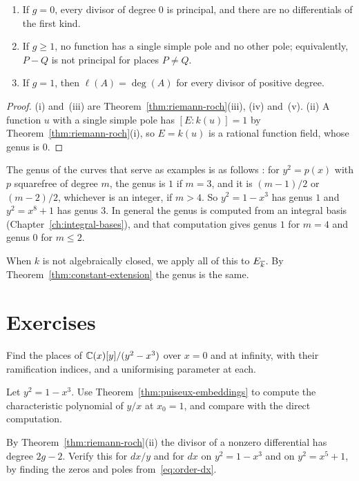 \begin{corollary}\label{cor:rr-consequences}
\begin{enumerate}[label=\textup{(\roman*)}]
\item If $g = 0$, every divisor of degree $0$ is principal, and there are no
  differentials of the first kind.
\item If $g \ge 1$, no function has a single simple pole and no other pole;
  equivalently, $P - Q$ is not principal for places $P \ne Q$.
\item If $g = 1$, then $\ell(A) = \deg(A)$ for every divisor of positive
  degree.
\end{enumerate}
\end{corollary}

\begin{proof}
(i) and~(iii) are Theorem~\ref{thm:riemann-roch}(iii), (iv) and~(v). (ii) A
function $u$ with a single simple pole has $[E : k(u)] = 1$ by
Theorem~\ref{thm:riemann-roch}(i), so $E = k(u)$ is a rational function
field, whose genus is $0$.
\end{proof}

The genus of the curves that serve as examples is as follows
\cite[Propositions~6.1.3 and~6.2.3]{stichtenoth2009}: for $y^2 = p(x)$ with
$p$ squarefree of degree $m$, the genus is $1$ if $m = 3$, and it is
$(m - 1)/2$ or $(m - 2)/2$, whichever is an integer, if $m > 4$. So $y^2 = 1 -
x^3$ has genus $1$ and $y^2 = x^8 + 1$ has genus $3$. In general the genus is
computed from an integral basis (Chapter~\ref{ch:integral-bases}), and that
computation gives genus $1$ for $m = 4$ and genus $0$ for $m \le 2$.

When $k$ is not algebraically closed, we apply all of this to $E_{\overline{k}}$.
By Theorem~\ref{thm:constant-extension} the genus is the same.

\section*{Exercises}

\begin{exercise}
Find the places of $\mathbb{C}(x)[y]/(y^2 - x^3)$ over $x = 0$ and at infinity, with
their ramification indices, and a uniformising parameter at each.
\end{exercise}

\begin{exercise}
Let $y^2 = 1 - x^3$. Use Theorem~\ref{thm:puiseux-embeddings} to compute the
characteristic polynomial of $y/x$ at $x_0 = 1$, and compare with the direct
computation.
\end{exercise}

\begin{exercise}
By Theorem~\ref{thm:riemann-roch}(ii) the divisor of a nonzero differential
has degree $2g - 2$. Verify this for $dx/y$ and for $dx$ on $y^2 = 1 - x^3$
and on $y^2 = x^5 + 1$, by finding the zeros and poles
from~\eqref{eq:order-dx}.
\end{exercise}
